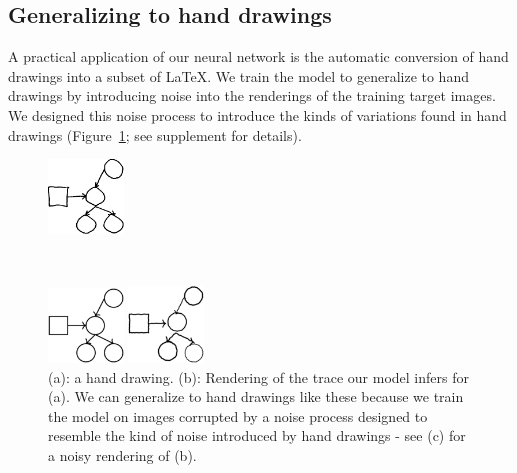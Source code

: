 \documentclass{article}
\begin{document}
\subsection{Generalizing to hand drawings}
A practical application of our neural network is the automatic conversion of hand drawings into a subset of \LaTeX.
 We train the model
to generalize to hand drawings by introducing noise into the
renderings of the training target images.
We designed this noise process to introduce the kinds of variations found in hand drawings (Figure~\ref{handDrawingExamples}; see supplement for details).

\begin{figure}
\centering  \begin{minipage}[t]{2.5cm}\centering\includegraphics[width = 2cm]{figures/expert-60-reduced.png}
    \subcaption{}
  \end{minipage}\\
   \begin{minipage}[t]{2.5cm}\includegraphics[width = 2cm]{figures/60-groundTruth-reduced.png}
    \subcaption{}
  \end{minipage}%
  \begin{minipage}[t]{2.5cm}\includegraphics[width = 2cm]{figures/60-1-reduced.png}
    \subcaption{}
  \end{minipage}%
    \caption{(a): a hand drawing. (b): Rendering of the trace our model infers for (a). We can generalize to hand drawings like these because we train the model on images corrupted by a noise process designed to resemble the kind of noise introduced by hand drawings - see (c) for a noisy rendering of (b).}\label{handDrawingExamples}
\end{figure}
\end{document}

